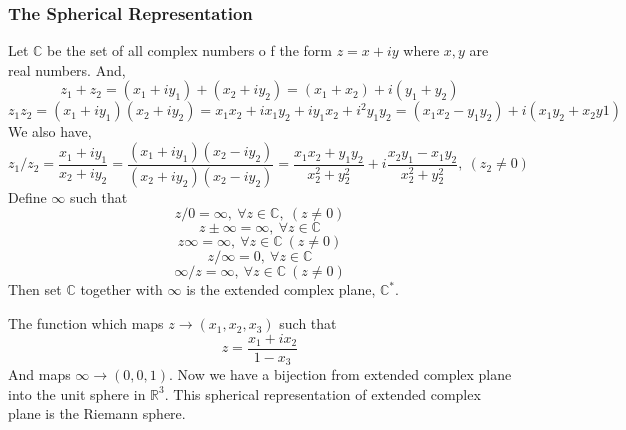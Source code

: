 

\setcounter{subsection}{2}
\setcounter{subsubsection}{3}
\subsubsection{The Spherical Representation}
\begin{definition}
	Let $\mathbb{C}$ be the set of all complex numbers o f the form $z = x+iy$ where $x,y$ are real numbers.
	And,
	\[ z_1+z_2 = (x_1+iy_1) + (x_2+iy_2) = (x_1+x_2) + i (y_1+y_2) \]
	\[ z_1 z_2 = (x_1+iy_1) (x_2+iy_2) = x_1x_2 + ix_1y_2 + iy_1x_2 + i^2y_1y_2 = (x_1x_2-y_1y_2) + i(x_1y_2+x_2y1) \]
	We also have,
	\[ z_1/z_2 = \frac{x_1+iy_1}{x_2+iy_2} = \frac{(x_1+iy_1)(x_2-iy_2)}{(x_2+iy_2)(x_2-iy_2)} = \frac{x_1x_2+y_1y_2}{x_2^2+y_2^2}+i\frac{x_2y_1-x_1y_2}{x_2^2+y_2^2},\ (z_2 \ne 0) \]
	Define $\infty$ such that
	\[ z/0 = \infty,\ \forall z \in \mathbb{C},\ (z \ne 0)\]
	\[ z \pm \infty = \infty,\ \forall z \in \mathbb{C} \]
	\[ z \infty = \infty,\ \forall z \in \mathbb{C}\ (z \ne 0) \]
	\[ z / \infty = 0,\ \forall z \in \mathbb{C} \]
	\[ \infty/z = \infty,\ \forall z \in \mathbb{C}\ (z \ne 0) \]
	Then set $\mathbb{C}$ together with $\infty$ is the extended complex plane, $\mathbb{C}^\ast$.
\end{definition}

\begin{definition}
	The function which maps $z \to (x_1,x_2,x_3)$ such that
	\begin{equation}
		z = \frac{x_1+ix_2}{1-x_3}
		\label{eqn:projection}
	\end{equation}
	And maps $\infty \to (0,0,1)$.
	Now we have a bijection from extended complex plane into the unit sphere in $\mathbb{R}^3$.
	This spherical representation of extended complex plane is the Riemann sphere.
\end{definition}

